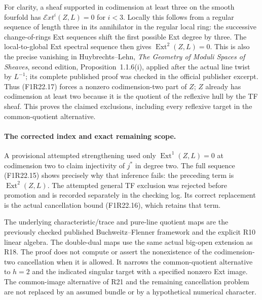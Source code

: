 For clarity, a sheaf supported in codimension at least
three on the smooth fourfold has
$\mathcal Ext^i(Z,L)=0$ for $i<3$. Locally this follows
from a regular sequence of length three in its
annihilator in the regular local ring: the successive
change-of-rings Ext sequences shift the first possible
Ext degree by three. The local-to-global Ext spectral
sequence then gives $\operatorname{Ext}^2(Z,L)=0$.
This is also the precise vanishing in Huybrechts--Lehn,
\emph{The Geometry of Moduli Spaces of Sheaves}, second
edition, Proposition~1.1.6(i), applied after the actual
line twist by $L^{-1}$; its complete published proof
was checked in the official publisher excerpt.
Thus (F1R22.17) forces a nonzero codimension-two part
of $Z$; $Z$ already has codimension at least two
because it is the quotient of the reflexive hull by the TF sheaf.
This proves the claimed exclusions, including every
reflexive target in the common-quotient alternative.

\paragraph{The corrected index and exact remaining scope.}
A provisional attempted strengthening used only
$\operatorname{Ext}^1(Z,L)=0$ at codimension two to
claim injectivity of $j^*$ in degree two. The full
sequence (F1R22.15) shows precisely why that inference
fails: the preceding term is $\operatorname{Ext}^2(Z,L)$.
The attempted general TF exclusion was rejected before
promotion and is recorded separately in the checking
log. Its correct replacement is the actual cancellation
bound (F1R22.16), which retains that term.

The underlying characteristic/trace and pure-line
quotient maps are the previously checked published
Buchweitz--Flenner framework and the explicit R10
linear algebra. The double-dual maps use the same
actual big-open extension as R18. The proof does
not compute or assert the nonexistence of the
codimension-two cancellation when it is allowed.
It narrows the common-quotient alternative to
$h=2$ and the indicated singular target with a
specified nonzero Ext image. The common-image
alternative of R21 and the remaining cancellation
problem are not replaced by an assumed bundle or
by a hypothetical numerical character.
